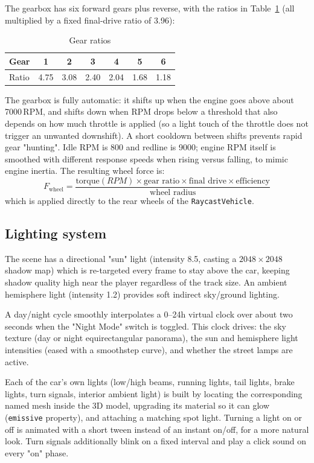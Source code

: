 \documentclass[11pt]{article}
\begin{document}
The gearbox has six forward gears plus reverse, with the ratios in
Table~\ref{tab:gears} (all multiplied by a fixed final-drive ratio of
3.96):

\begin{table}[h]
\centering
\caption{Gear ratios}
\label{tab:gears}
\begin{tabular}{lcccccc}
\toprule
Gear & 1 & 2 & 3 & 4 & 5 & 6 \\
\midrule
Ratio & 4.75 & 3.08 & 2.40 & 2.04 & 1.68 & 1.18 \\
\bottomrule
\end{tabular}
\end{table}

The gearbox is fully automatic: it shifts up when the engine goes above
about 7000\,RPM, and shifts down when RPM drops below a threshold that also
depends on how much throttle is applied (so a light touch of the throttle
does not trigger an unwanted downshift). A short cooldown between shifts
prevents rapid gear "hunting". Idle RPM is 800 and redline is 9000; engine
RPM itself is smoothed with different response speeds when rising versus
falling, to mimic engine inertia. The resulting wheel force is:
\[ F_{\text{wheel}} = \frac{\text{torque}(RPM) \times \text{gear ratio}
\times \text{final drive} \times \text{efficiency}}{\text{wheel radius}} \]
which is applied directly to the rear wheels of the \texttt{RaycastVehicle}.

\subsection{Lighting system}
The scene has a directional "sun" light (intensity 8.5, casting a
$2048\times2048$ shadow map) which is re-targeted every frame to stay above
the car, keeping shadow quality high near the player regardless of the
track size. An ambient hemisphere light (intensity 1.2) provides soft
indirect sky/ground lighting.

A day/night cycle smoothly interpolates a 0--24h virtual clock over about
two seconds when the "Night Mode" switch is toggled. This clock drives: the
sky texture (day or night equirectangular panorama), the sun and hemisphere
light intensities (eased with a smoothstep curve), and whether the street
lamps are active.

Each of the car's own lights (low/high beams, running lights, tail lights,
brake lights, turn signals, interior ambient light) is built by locating
the corresponding named mesh inside the 3D model, upgrading its material so
it can glow (\texttt{emissive} property), and attaching a matching spot
light. Turning a light on or off is animated with a short tween instead of
an instant on/off, for a more natural look. Turn signals additionally blink
on a fixed interval and play a click sound on every "on" phase.
\end{document}

